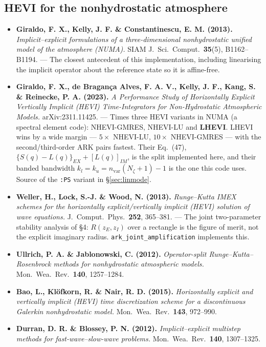 \documentclass[11pt,a4paper]{article}
\begin{document}
\subsection{HEVI for the nonhydrostatic atmosphere}
\begin{itemize}
\item \textbf{Giraldo, F. X., Kelly, J. F. \& Constantinescu, E. M. (2013).}
  \emph{Implicit--explicit formulations of a three-dimensional nonhydrostatic
  unified model of the atmosphere (NUMA).} SIAM J.\ Sci.\ Comput.\
  \textbf{35}(5), B1162--B1194. --- The closest antecedent of this
  implementation, including linearising the implicit operator about the
  reference state so it is affine-free.
\item \textbf{Giraldo, F. X., de Bragan\c{c}a Alves, F. A. V., Kelly, J. F.,
  Kang, S. \& Reinecke, P. A. (2023).} \emph{A Performance Study of
  Horizontally Explicit Vertically Implicit (HEVI) Time-Integrators for
  Non-Hydrostatic Atmospheric Models.} arXiv:2311.11425.
  --- Times three HEVI variants in NUMA (a spectral element code):
  NHEVI-GMRES, NHEVI-LU and \textbf{LHEVI}. LHEVI wins by a wide margin ---
  $5\times$ NHEVI-LU, $10\times$ NHEVI-GMRES --- with the second/third-order
  ARK pairs fastest. Their Eq.~(47),
  $\{S(q)-L(q)\}_{EX} + [L(q)]_{IM}$, is the split implemented here, and their
  banded bandwidth $k_l = k_u = n_{\mathrm{var}}(N_\zeta+1)-1$ is the one this
  code uses. Source of the \texttt{:PS} variant in \S\ref{sec:linmode}.
\item \textbf{Weller, H., Lock, S.-J. \& Wood, N. (2013).} \emph{Runge--Kutta
  IMEX schemes for the horizontally explicit/vertically implicit (HEVI)
  solution of wave equations.} J.\ Comput.\ Phys.\ \textbf{252}, 365--381.
  --- The joint two-parameter stability analysis of \S4:
  $R(z_E,z_I)$ over a rectangle is the figure of merit, not the explicit
  imaginary radius. \texttt{ark\_joint\_amplification} implements this.
\item \textbf{Ullrich, P. A. \& Jablonowski, C. (2012).} \emph{Operator-split
  Runge--Kutta--Rosenbrock methods for nonhydrostatic atmospheric models.}
  Mon.\ Wea.\ Rev.\ \textbf{140}, 1257--1284.
\item \textbf{Bao, L., Kl\"ofkorn, R. \& Nair, R. D. (2015).} \emph{Horizontally
  explicit and vertically implicit (HEVI) time discretization scheme for a
  discontinuous Galerkin nonhydrostatic model.} Mon.\ Wea.\ Rev.\
  \textbf{143}, 972--990.
\item \textbf{Durran, D. R. \& Blossey, P. N. (2012).} \emph{Implicit--explicit
  multistep methods for fast-wave--slow-wave problems.} Mon.\ Wea.\ Rev.\
  \textbf{140}, 1307--1325.
\end{itemize}
\end{document}
